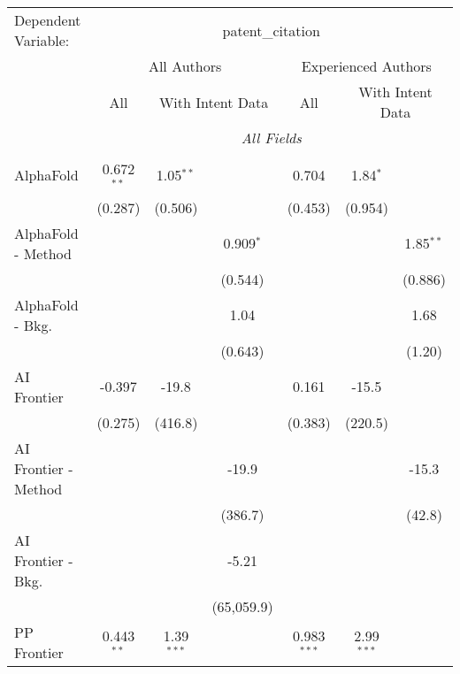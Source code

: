\begingroup
\centering
\begin{tabular}{lcccccc}
   \tabularnewline \midrule \midrule
   Dependent Variable: & \multicolumn{6}{c}{patent\_citation}\\
 & \multicolumn{3}{c}{All Authors} & \multicolumn{3}{c}{Experienced Authors} \\
\cmidrule(lr){2-4} \cmidrule(lr){5-7}
 & \multicolumn{1}{c}{All} & \multicolumn{2}{c}{With Intent Data} & \multicolumn{1}{c}{All} & \multicolumn{2}{c}{With Intent Data} \\
\cmidrule(lr){2-2} \cmidrule(lr){3-4} \cmidrule(lr){5-5} \cmidrule(lr){6-7}
 & \multicolumn{6}{c}{\textit{All Fields}} \\ \\
   AlphaFold            & 0.672$^{**}$ & 1.05$^{**}$  &              & 0.704         & 1.84$^{*}$   &   \\   
                        & (0.287)      & (0.506)      &              & (0.453)       & (0.954)      &   \\   
   AlphaFold - Method   &              &              & 0.909$^{*}$  &               &              & 1.85$^{**}$\\   
                        &              &              & (0.544)      &               &              & (0.886)\\   
   AlphaFold - Bkg.     &              &              & 1.04         &               &              & 1.68\\   
                        &              &              & (0.643)      &               &              & (1.20)\\   
   AI Frontier          & -0.397       & -19.8        &              & 0.161         & -15.5        &   \\   
                        & (0.275)      & (416.8)      &              & (0.383)       & (220.5)      &   \\   
   AI Frontier - Method &              &              & -19.9        &               &              & -15.3\\   
                        &              &              & (386.7)      &               &              & (42.8)\\   
   AI Frontier - Bkg.   &              &              & -5.21        &               &              &   \\   
                        &              &              & (65,059.9)   &               &              &   \\   
   PP Frontier          & 0.443$^{**}$ & 1.39$^{***}$ &              & 0.983$^{***}$ & 2.99$^{***}$ &   \\   

\end{tabular}
